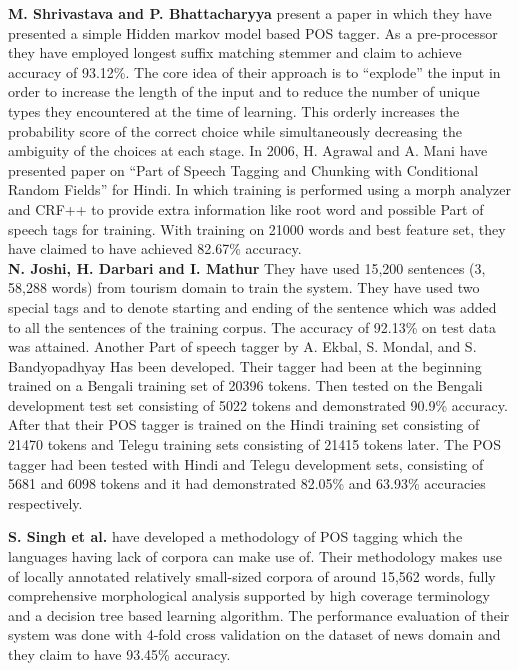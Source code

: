 \documentclass[12pt,a4paper,oneside]{memoir}
\begin{document}
\textbf{M. Shrivastava and P. Bhattacharyya} present a paper in which they have presented a simple Hidden markov model based POS tagger. As a pre-processor they have employed longest suffix matching stemmer and claim to achieve accuracy of 93.12\%. The core idea of their approach is to “explode” the input in order to increase the length of the input and to reduce the number of unique types they encountered at the time of learning. This orderly increases the probability score of the correct choice while simultaneously decreasing the ambiguity of the choices at each stage.
In 2006, H. Agrawal and A. Mani have presented paper on “Part of Speech Tagging and Chunking with Conditional Random Fields” for Hindi. In which training is performed using a morph analyzer and CRF++ to provide extra information like root word and possible Part of speech tags for training. With training on 21000 words and best feature set, they have claimed to have achieved 82.67\% accuracy.\\

\textbf{N. Joshi, H. Darbari and I. Mathur} They have used 15,200 sentences (3, 58,288 words) from tourism domain to train the system. They have used two special tags and to denote starting and ending of the sentence which was added to all the sentences of the training corpus. The accuracy of 92.13\% on test data was attained. Another Part of speech tagger by A. Ekbal, S. Mondal, and S. Bandyopadhyay Has been developed. Their tagger had been at the beginning trained on a Bengali training set of 20396 tokens. Then tested on the Bengali development test set consisting of 5022 tokens and demonstrated 90.9\% accuracy. After that their POS tagger is trained on the Hindi training set consisting of 21470 tokens and Telegu training sets consisting of 21415 tokens later. The POS tagger had been tested with Hindi and Telegu development sets, consisting of 5681 and 6098 tokens and it had demonstrated 82.05\% and 63.93\% accuracies respectively.
 
\textbf{S. Singh et al.} have developed a methodology of POS tagging which the languages having lack of corpora can make use of. Their methodology makes use of locally annotated relatively small-sized corpora of around 15,562 words, fully comprehensive morphological analysis supported by high coverage terminology and a decision tree based learning algorithm. The performance evaluation of their system was done with 4-fold cross validation on the dataset of news domain and they claim to have 93.45\% accuracy. \\
\end{document}
